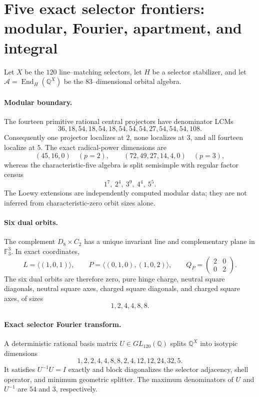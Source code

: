 \section{Five exact selector frontiers: modular, Fourier, apartment, and integral}
\label{sec:selector-five-frontiers-1390-1394}

Let $X$ be the $120$ line--matching selectors, let $H$ be a selector stabilizer, and let $\mathcal A=\operatorname{End}_H(\mathbb Q^X)$ be the $83$--dimensional orbital algebra.

\paragraph{Modular boundary.}
The fourteen primitive rational central projectors have denominator LCMs
\[
36,18,54,18,54,18,54,54,54,27,54,54,54,108.
\]
Consequently one projector localizes at $2$, none localizes at $3$, and all fourteen localize at $5$.  The exact radical-power dimensions are
\[
(45,16,0)\quad(p=2),
\qquad
(72,49,27,14,4,0)\quad(p=3),
\]
whereas the characteristic-five algebra is split semisimple with regular factor census
\[
1^7,\ 2^4,\ 3^9,\ 4^4,\ 5^5.
\]
The Loewy extensions are independently computed modular data; they are not inferred from characteristic-zero orbit sizes alone.

\paragraph{Six dual orbits.}
The complement $D_8\times C_2$ has a unique invariant line and complementary plane in $\mathbb F_3^3$.  In exact coordinates,
\[
L=\langle(1,0,1)\rangle,
\qquad
P=\langle(0,1,0),(1,0,2)\rangle,
\qquad
Q_P=\begin{pmatrix}2&0\\0&2\end{pmatrix}.
\]
The six dual orbits are therefore zero, pure hinge charge, neutral square diagonals, neutral square axes, charged square diagonals, and charged square axes, of sizes
\[
1,2,4,4,8,8.
\]

\paragraph{Exact selector Fourier transform.}
A deterministic rational basis matrix $U\in GL_{120}(\mathbb Q)$ splits $\mathbb Q^X$ into isotypic dimensions
\[
1,2,2,4,4,8,8,2,4,12,12,24,32,5.
\]
It satisfies $U^{-1}U=I$ exactly and block diagonalizes the selector adjacency, shell operator, and minimum geometric splitter.  The maximum denominators of $U$ and $U^{-1}$ are $54$ and $3$, respectively.

